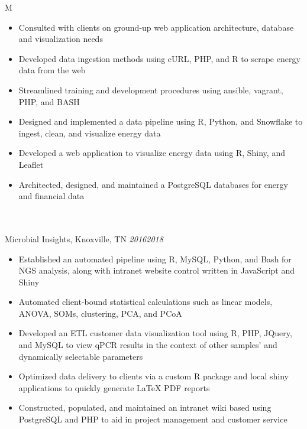 \documentclass[10pt]{article}%
\begin{document}
\begin{tabularx}{\linewidth}{M}
\begin{itemize}[topsep=-12pt,parsep=0em]
         \item Consulted with clients on ground-up web application architecture, database and visualization needs%
         \item Developed data ingestion methods using cURL, PHP, and R to scrape energy data from the web %
         \item Streamlined training and development procedures using ansible, vagrant, PHP, and BASH %
         \item Designed and implemented a data pipeline using R, Python, and Snowflake to ingest, clean, and visualize energy data %
         \item Developed a web application to visualize energy data using R, Shiny, and Leaflet %
         \item Architected, designed, and maintained a PostgreSQL databases for energy and financial data %
      \end{itemize} \\
       \\
      Microbial Insights, Knoxville, TN \textit{2016\textemdash{}2018} \\
      \begin{itemize}[topsep=-12pt,parsep=0em]
         \setlength\itemsep{0em}
         \item Established an automated pipeline using R, MySQL, Python, and Bash for NGS analysis, along with intranet website control written in JavaScript and Shiny  %
         \item Automated client-bound statistical calculations such as linear models, ANOVA, SOMs, clustering, PCA, and PCoA %
         \item Developed an ETL customer data visualization tool using R, PHP, JQuery, and MySQL to view qPCR results in the context of other samples' and dynamically selectable parameters %
         \item Optimized data delivery to clients via a custom R package and local shiny applications to quickly generate \LaTeX{} PDF reports  %
         \item Constructed, populated, and maintained an intranet wiki based using PostgreSQL and PHP to aid in project management and customer service
        \end{itemize} \\
        \\

\end{tabularx}
\end{document}
